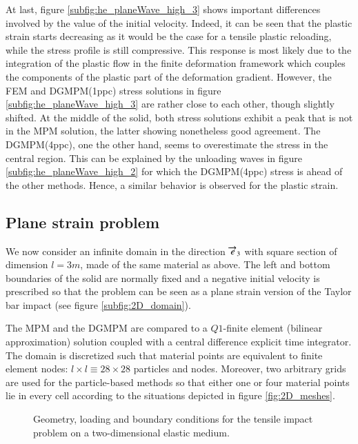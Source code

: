 At last, figure \ref{subfig:he_planeWave_high_3} shows important differences involved by the value of the initial velocity.
Indeed, it can be seen that the plastic strain starts decreasing as it would be the case for a tensile plastic reloading, while the stress profile is still compressive.
This response is most likely due to the integration of the plastic flow in the finite deformation framework which couples the components of the plastic part of the deformation gradient.
However, the FEM and DGMPM(1ppc) stress solutions in figure \ref{subfig:he_planeWave_high_3} are rather close to each other, though slightly shifted.
At the middle of the solid, both stress solutions exhibit a peak that is not in the MPM solution, the latter showing nonetheless good agreement.
The DGMPM(4ppc), one the other hand, seems to overestimate the stress in the central region.
This can be explained by the unloading waves in figure \ref{subfig:he_planeWave_high_2} for which the DGMPM(4ppc) stress is ahead of the other methods.
Hence, a similar behavior is observed for the plastic strain.

\subsection{Plane strain problem}
\label{sec:plane-strain-problem}
We now consider an infinite domain in the direction ${\overrightarrow{e}}_3$ with square section of dimension $l=3m$, made of the same material as above.
The left and bottom boundaries of the solid are normally fixed and a negative initial velocity is prescribed so that the problem can be seen as a plane strain version of the Taylor bar impact (see figure \ref{subfig:2D_domain}).


The MPM and the DGMPM are compared to a $Q1$-finite element (bilinear approximation) solution coupled with a central difference explicit time integrator.
The domain is discretized such that material points are equivalent to finite element nodes: $l\times l \equiv 28 \times 28$ particles and nodes.
Moreover, two arbitrary grids are used for the particle-based methods so that either one or four material points lie in every cell according to the situations depicted in figure \ref{fig:2D_meshes}.
\begin{figure}[ht]
  \centering
   \qquad
  \caption{Geometry, loading and boundary conditions for the tensile impact problem on a two-dimensional elastic medium.}
  \label{fig:PS_domain}
\end{figure}

